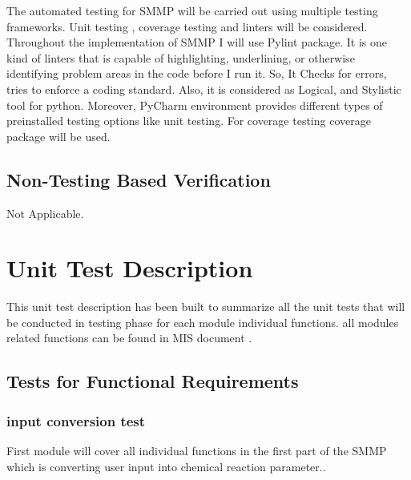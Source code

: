 \documentclass[12pt, titlepage]{article}
\begin{document}
The automated testing for SMMP will be carried out using multiple testing frameworks. Unit testing , coverage testing and linters will be considered. Throughout the implementation of SMMP I will use Pylint package. It is one kind of linters that is capable of highlighting, underlining, or otherwise identifying problem areas in the code before I run it. So, It Checks for errors, tries to enforce a coding standard. Also, it is considered as Logical, and Stylistic tool for python. Moreover, PyCharm environment provides  different types of preinstalled testing options like unit testing. For coverage testing coverage package will be used.



\subsection{Non-Testing Based Verification}

Not Applicable. 


\section{Unit Test Description}

This unit test description has been built to summarize all the unit tests that will be conducted in testing phase for each module individual functions. all modules related functions can be found in MIS document .

\subsection{Tests for Functional Requirements}

\subsubsection{input conversion test}

 First module will cover all individual functions in the first part of the SMMP which is converting user input into chemical reaction parameter.. 
\end{document}
